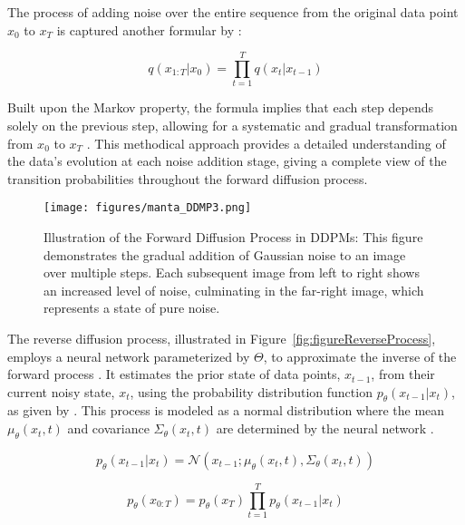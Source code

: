
The process of adding noise over the entire sequence from the original data point \( x_0 \) to \( x_T \) is captured another formular by \citeauthor{martinez2023understanding}:

\[q(x_{1:T} | x_0) = \prod_{t=1}^T q(x_t | x_{t-1}) \] 

Built upon the Markov property, the formula implies that each step depends solely on the previous step, allowing for a systematic and gradual transformation from \( x_0 \) to \( x_T \) \citep{martinez2023understanding}. This methodical approach provides a detailed understanding of the data's evolution at each noise addition stage, giving a complete view of the transition probabilities throughout the forward diffusion process.

\begin{figure}[ht]
\centering
  \texttt{[image: figures/manta\_DDMP3.png]}
  \caption{Illustration of the Forward Diffusion Process in DDPMs: This figure demonstrates the gradual addition of Gaussian noise to an image over multiple steps. Each subsequent image from left to right shows an increased level of noise, culminating in the far-right image, which represents a state of pure noise.}\label{fig:figureForwardProcess}
\end{figure}

The reverse diffusion process, illustrated in Figure~\ref{fig:figureReverseProcess}, employs a neural network parameterized by \(\Theta\), to approximate the inverse of the forward process \citep{sohlDDPM, yangdiffusionSummary}. It estimates the prior state of data points, \( x_{t-1} \), from their current noisy state, \( x_t \), using the probability distribution function \( p_\theta(x_{t-1} | x_t) \), as given by \citeauthor{martinez2023understanding}. This process is modeled as a normal distribution where the mean \( \mu_\theta(x_t, t) \) and covariance \( \Sigma_\theta(x_t, t) \) are determined by the neural network \citep{yangdiffusionSummary}.

\[
  p_\theta(x_{t-1} | x_t) = \mathcal{N}(x_{t-1}; \mu_\theta(x_t, t), \Sigma_\theta(x_t, t))
\] 

\[p_\theta(x_{0:T}) = p_\theta(x_{T}) \prod_{t=1}^T p_\theta(x_{t-1} | x_t) \]

